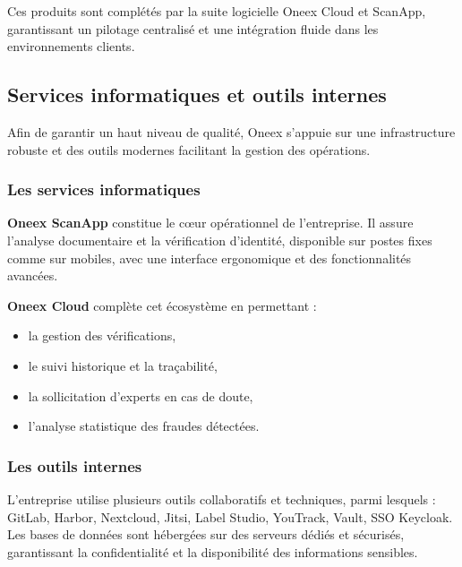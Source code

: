 Ces produits sont complétés par la suite logicielle Oneex Cloud et ScanApp, garantissant un pilotage centralisé et une intégration fluide dans les environnements clients.

\subsection{Services informatiques et outils internes}

Afin de garantir un haut niveau de qualité, Oneex s’appuie sur une infrastructure robuste et des outils modernes facilitant la gestion des opérations.

\subsubsection{Les services informatiques}

\textbf{Oneex ScanApp} constitue le cœur opérationnel de l’entreprise. Il assure l’analyse documentaire et la vérification d’identité, disponible sur postes fixes comme sur mobiles, avec une interface ergonomique et des fonctionnalités avancées.

\textbf{Oneex Cloud} complète cet écosystème en permettant :

\begin{itemize}
  \item la gestion des vérifications,
  \item le suivi historique et la traçabilité,
  \item la sollicitation d’experts en cas de doute,
  \item l’analyse statistique des fraudes détectées.
\end{itemize}

\subsubsection{Les outils internes}

L’entreprise utilise plusieurs outils collaboratifs et techniques, parmi lesquels :
GitLab, Harbor, Nextcloud, Jitsi, Label Studio, YouTrack, Vault, SSO Keycloak.  
Les bases de données sont hébergées sur des serveurs dédiés et sécurisés, garantissant la confidentialité et la disponibilité des informations sensibles.